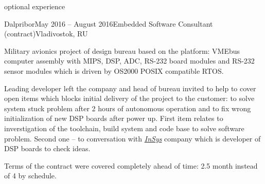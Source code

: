 \documentclass{template}
\begin{document}

\begin{rSection}{optional experience}
\begin{rCompany}{Dalpribor}{May 2016 -- August 2016}{Embedded Software Consultant (contract)}{Vladivostok, RU}

\item Military avionics project of design bureau based on the  platform: VMEbus computer assembly with MIPS, DSP, ADC, RS-232
      board modules and RS-232 sensor modules which is driven by OS2000 POSIX compatible RTOS.
\item Leading developer left the company and head of bureau invited to help to cover open items which blocks initial delivery of the project to
      the customer: to solve system stuck problem after 2 hours of autonomous operation and to fix wrong initialization of new DSP boards after
      power up. First item relates to inverstigation of the toolchain, build system and code base to solve software problem. Second one -- to conversation
      with \href{http://www.insys.ru}{\textit{InSys}} company which is developer of DSP boards to check ideas.
\item Terms of the contract were covered completely ahead of time: 2.5 month instead of 4 by schedule.

\end{rCompany}
\end{rSection}

\end{document}
